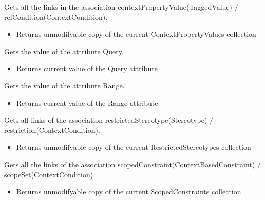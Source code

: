 \begin{desc}Gets all the links in the association contextPropertyValue(TaggedValue)
 $/$ refCondition(ContextCondition).
\begin{itemize}
\item{Returns unmodifyable copy of the current ContextPropertyValues collection }
\end{itemize}
\end{desc}

\begin{desc}Gets the value of the attribute Query.
\begin{itemize}
\item{Returns current value of the Query attribute }
\end{itemize}
\end{desc}

\begin{desc}Gets the value of the attribute Range.
\begin{itemize}
\item{Returns current value of the Range attribute }
\end{itemize}
\end{desc}

\begin{desc}Gets all links of the association restrictedStereotype(Stereotype)
 $/$ restriction(ContextCondition).
\begin{itemize}
\item{Returns unmodifyable copy of the current RestrictedStereotypes collection }
\end{itemize}
\end{desc}

\begin{desc}Gets all the links of the association scopedConstraint(ContextBasedConstraint)
 $/$ scopeSet(ContextCondition).
\begin{itemize}
\item{Returns unmodifyable copy of the current ScopedConstraints collection }
\end{itemize}
\end{desc}

